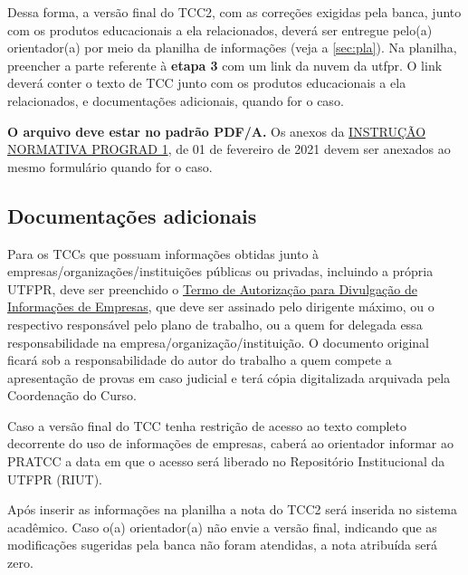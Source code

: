 \documentclass[a4paper, 12pt]{article}
\begin{document}
	Dessa forma, a versão final do TCC2, com as correções exigidas pela banca, junto com os produtos educacionais a ela relacionados, deverá ser entregue pelo(a) orientador(a) por meio da planilha de informações (veja a \autoref{sec:pla}). Na planilha, preencher a parte referente à \textbf{etapa 3} com um link da nuvem da utfpr. O link deverá conter o texto de TCC junto com os produtos educacionais a ela relacionados, e documentações adicionais, quando for o caso.
	
	\textbf{O arquivo deve estar no padrão PDF/A.} Os anexos da \href{https://sei.utfpr.edu.br/sei/publicacoes/controlador_publicacoes.php?acao=publicacao_visualizar&id_documento=2042165&id_orgao_publicacao=0}{INSTRUÇÃO NORMATIVA PROGRAD 1}, de 01 de fevereiro de 2021 devem ser anexados ao mesmo formulário quando for o caso. 

	\subsection{Documentações adicionais}
    Para os TCCs que possuam informações obtidas junto à empresas/organizações/instituições públicas ou privadas, incluindo a própria UTFPR, deve ser preenchido o \href{https://sei.utfpr.edu.br/sei/publicacoes/controlador_publicacoes.php?acao=publicacao_visualizar&id_documento=2651593&id_orgao_publicacao=0}{Termo de Autorização para Divulgação de Informações de Empresas}, que deve ser assinado pelo dirigente máximo, ou o respectivo responsável pelo plano de trabalho, ou a quem for delegada essa responsabilidade na empresa/organização/instituição. O documento original ficará sob a responsabilidade do autor do trabalho a quem compete a apresentação de provas em caso judicial e terá cópia digitalizada arquivada pela Coordenação do Curso.

	Caso a versão final do TCC tenha restrição de acesso ao texto completo decorrente do uso de informações de empresas, caberá ao orientador informar ao PRATCC a data em que o acesso será liberado no Repositório Institucional da UTFPR (RIUT).
		
	Após inserir as informações na planilha a nota do TCC2 será inserida no sistema acadêmico. Caso o(a) orientador(a) não envie a versão final, indicando que as modificações sugeridas pela banca não foram atendidas, a nota atribuída será zero.
\end{document}
